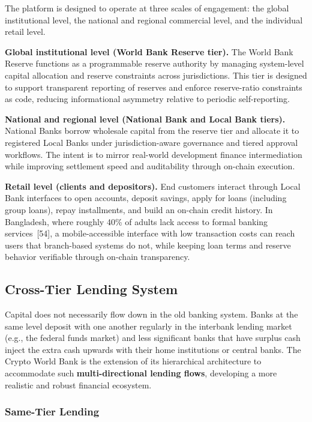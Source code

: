 \documentclass[12pt,a4paper]{report}
\begin{document}
The platform is designed to operate at three scales of engagement: the global institutional level, the national and regional commercial level, and the individual retail level.

\textbf{Global institutional level (World Bank Reserve tier).} The World Bank Reserve functions as a programmable reserve authority by managing system-level capital allocation and reserve constraints across jurisdictions. This tier is designed to support transparent reporting of reserves and enforce reserve-ratio constraints as code, reducing informational asymmetry relative to periodic self-reporting.

\textbf{National and regional level (National Bank and Local Bank tiers).} National Banks borrow wholesale capital from the reserve tier and allocate it to registered Local Banks under jurisdiction-aware governance and tiered approval workflows. The intent is to mirror real-world development finance intermediation while improving settlement speed and auditability through on-chain execution.

\textbf{Retail level (clients and depositors).} End customers interact through Local Bank interfaces to open accounts, deposit savings, apply for loans (including group loans), repay installments, and build an on-chain credit history. In Bangladesh, where roughly 40\% of adults lack access to formal banking services~[54], a mobile-accessible interface with low transaction costs can reach users that branch-based systems do not, while keeping loan terms and reserve behavior verifiable through on-chain transparency.

\subsection{Cross-Tier Lending System}

Capital does not necessarily flow down in the old banking system. Banks at the same level deposit with one another regularly in the interbank lending market (e.g., the federal funds market) and less significant banks that have surplus cash inject the extra cash upwards with their home institutions or central banks. The Crypto World Bank is the extension of its hierarchical architecture to accommodate such \textbf{multi-directional lending flows}, developing a more realistic and robust financial ecosystem.

\subsubsection{Same-Tier Lending}
\end{document}
